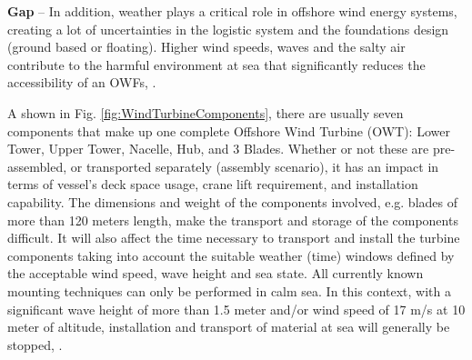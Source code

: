 \textbf{Gap} --
In addition, weather plays a critical role in offshore wind energy systems, creating a lot of uncertainties in the logistic system and the foundations design (ground based or floating). Higher wind speeds, waves and the salty air contribute to the harmful environment at sea that significantly reduces the accessibility of an OWFs, \cite{Smit2007}.

A shown in Fig. \ref{fig:WindTurbineComponents}, there are usually seven components that make up one complete Offshore Wind Turbine (OWT): Lower Tower, Upper Tower, Nacelle, Hub, and 3 Blades. Whether or not these are pre-assembled, or transported separately (assembly scenario), it has an impact in terms of vessel’s deck space usage, crane lift requirement, and installation capability. The dimensions and weight of the components involved, e.g. blades of more than 120 meters length, make the transport and storage of the components difficult. It will also affect the time necessary to transport and install the turbine components taking into account the suitable weather (time) windows defined by the acceptable wind speed, wave height and sea state. All currently known mounting techniques can only be performed in calm sea. In this context, with a significant wave height of more than 1.5 meter and/or wind speed of 17 m/s at 10 meter of altitude, installation and transport of material at sea will generally be stopped, \cite{aitsimulation}.
